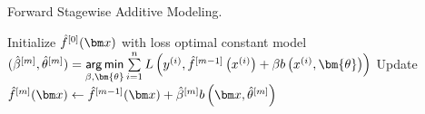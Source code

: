 \begin{algorithm}[H]
  \begin{footnotesize}
  \begin{center}
	\caption{Forward Stagewise Additive Modeling.}
    \begin{algorithmic}[1]
      \State Initialize $\hat{f}^{[0]}(\xv)$ with loss optimal constant model%
        \State $(\betamh, \thetamh) = \argmin \limits_{\beta, \bm{\theta}} \sum \limits_{i=1}^n
                 L\left(\yi, \fmdh\left(\xi\right) + \beta b\left(\xi, \bm{\theta}\right)\right)$
        \vspace{1.5ex}
        \State Update $\fmh(\xv) \gets \fmdh(\xv) + \betamh b\left(\xv, \thetamh\right)$
      \EndFor
    \end{algorithmic}
    \end{center}
    \end{footnotesize}
\end{algorithm}
